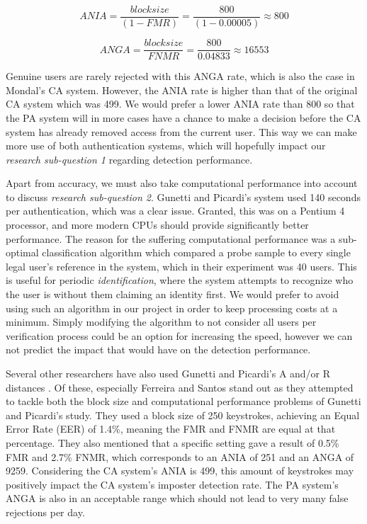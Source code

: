 \begin{equation}
ANIA = \frac{block size}{(1-FMR)} = \frac{800}{(1-0.00005)} \approx 800
\end{equation}

\begin{equation}
ANGA = \frac{block size}{FNMR} = \frac{800}{0.04833} \approx 16553
\end{equation}

Genuine users are rarely rejected with this ANGA rate, which is also the case in Mondal's \cite{mondal} CA system.
However, the ANIA rate is higher than that of the original CA system which was 499.
We would prefer a lower ANIA rate than 800 so that the PA system will in more cases have a chance to make a decision before the CA system has already removed access from the current user.
This way we can make more use of both authentication systems, which will hopefully impact our \textit{research sub-question 1} regarding detection performance.

Apart from accuracy, we must also take computational performance into account to discuss \textit{research sub-question 2}.
Gunetti and Picardi's \cite{gnp} system used 140 seconds per authentication, which was a clear issue.
Granted, this was on a Pentium 4 processor, and more modern CPUs should provide significantly better performance.
The reason for the suffering computational performance was a sub-optimal classification algorithm which compared a probe sample to every single legal user's reference in the system, which in their experiment was 40 users.
This is useful for periodic \textit{identification}, where the system attempts to recognize who the user is without them claiming an identity first.
We would prefer to avoid using such an algorithm in our project in order to keep processing costs at a minimum.
Simply modifying the algorithm to not consider all users per verification process could be an option for increasing the speed, however we can not predict the impact that would have on the detection performance.

Several other researchers have also used Gunetti and Picardi's A and/or R distances \cite{davoudi2009, davoudi2010, superResults, hu, sliding, Kolakowska2011, Messerman, Pinto2014, meaningless, KANG201572}.
Of these, especially Ferreira and Santos \cite{superResults} stand out as they attempted to tackle both the block size and computational performance problems of Gunetti and Picardi's \cite{gnp} study.
They used a block size of 250 keystrokes, achieving an Equal Error Rate (EER) of 1.4\%, meaning the FMR and FNMR are equal at that percentage.
They also mentioned that a specific setting gave a result of 0.5\% FMR and 2.7\% FNMR, which corresponds to an ANIA of 251 and an ANGA of 9259.
Considering the CA system's ANIA is 499, this amount of keystrokes may positively impact the CA system's imposter detection rate.
The PA system's ANGA is also in an acceptable range which should not lead to very many false rejections per day.

